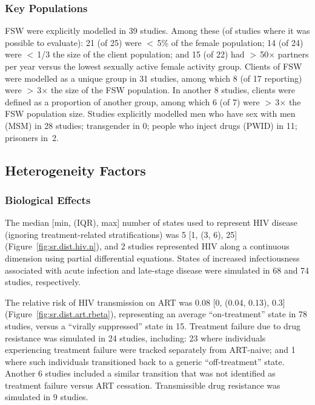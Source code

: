 \subsubsection{Key Populations}\label{sr.res.context.kp}
FSW were explicitly modelled in 39 studies.
Among these (of studies where it was possible to evaluate):
21 (of 25) were {$<$\,5\%} of the female population;
14 (of 24) were {$<$\,1/3} the size of the client population; and
15 (of 22) had {$>$\,50$\times$} partners per year versus
the lowest sexually active female activity group.
Clients of FSW were modelled as a unique group in 31 studies,
among which 8 (of 17 reporting) were {$>$\,3$\times$} the size of the FSW population.
In another 8 studies, clients were defined as a proportion of another group,
among which 6 (of 7) were {$>$\,3$\times$} the FSW population size.
Studies explicitly modelled men who have sex with men (MSM) in 28 studies;
transgender in 0; people who inject drugs (PWID) in 11; prisoners in~2.
\subsection{Heterogeneity Factors}\label{sr.res.f}
\subsubsection{Biological Effects}\label{sr.res.f.bio}
The median [min, (IQR), max] number of states used to represent HIV disease
(ignoring treatment-related stratifications) was 5 [1, (3, 6), 25] (Figure~\ref{fig:sr.dist.hiv.n}),
and 2 studies represented HIV along a continuous dimension using partial differential equations.
States of increased infectiousness associated with acute infection and late-stage disease
were simulated in 68 and 74 studies, respectively.
\par
The relative risk of HIV transmission on ART was 0.08 [0, (0.04, 0.13), 0.3]
(Figure~\ref{fig:sr.dist.art.rbeta}),
representing an average ``on-treatment'' state in 78 studies,
versus a ``virally suppressed'' state in 15.
Treatment failure due to drug resistance was simulated in 24 studies, including:
23 where individuals experiencing treatment failure were tracked separately from ART-naive;
and 1 where such individuals transitioned back to a generic ``off-treatment'' state.
Another 6 studies included a similar transition
that was not identified as treatment failure versus ART cessation.
Transmissible drug resistance was simulated in 9 studies.
